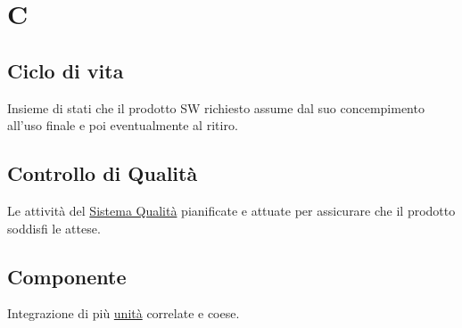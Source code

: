 \section{C}

    \subsection{Ciclo di vita}
    \label{glossario:ciclodivita}
    Insieme di stati che il prodotto SW richiesto assume dal suo concempimento all'uso finale e poi eventualmente al ritiro.

    \subsection{Controllo di Qualità}
    \label{glossario:controllodiqualita}
    Le attività del \hyperref[glossario:sistemaqualita]{Sistema Qualità} pianificate e attuate per assicurare che il prodotto soddisfi le attese.

    \subsection{Componente}
    \label{glossario:componente}
    Integrazione di più \hyperref[glossario:unita]{unità} correlate e coese.

\pagebreak